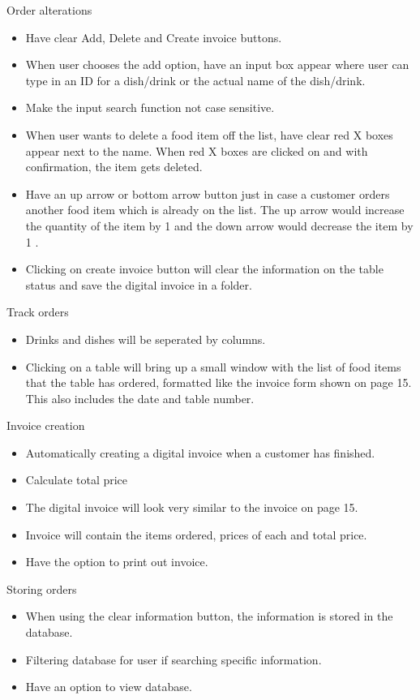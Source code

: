 Order alterations 
\begin{itemize}
	\item Have clear Add, Delete  and Create invoice buttons.
	\item When user chooses the add option, have an input box appear where user can type in an ID for a dish/drink or the actual name of the dish/drink.
	\item Make the input search function not case sensitive.
	\item When user wants to delete a food item off the list, have clear red X boxes appear next to the name. When red X boxes are clicked on and with confirmation, the item gets deleted.
	\item Have an up arrow or bottom arrow button just in case a customer orders another food item which is already on the list. The up arrow would increase the quantity of the item by 1 and the down arrow would 		decrease the item by 1 .
	\item Clicking on create invoice button will clear the information on the table status and save the digital invoice in a folder.
\end{itemize} 

Track orders
\begin{itemize}
	\item Drinks and dishes will be seperated by columns.
	\item Clicking on a table will bring up a small window with the list of food items that the table has ordered, formatted like the invoice form shown on page 15. This also includes the date and table number.
 
\end{itemize}

Invoice creation 
\begin{itemize}
	\item Automatically creating a digital invoice when a customer has finished.
	\item Calculate total price
	\item The digital invoice will look very similar to the invoice on page 15.
	\item Invoice will contain the items ordered, prices of each and total price.
	\item Have the option to print out invoice.
\end{itemize} 

Storing orders
\begin{itemize}
	\item When using the clear information button, the information is stored in the database.
	\item Filtering database for user if searching specific information.
	\item Have an option to view database.
\end{itemize}


